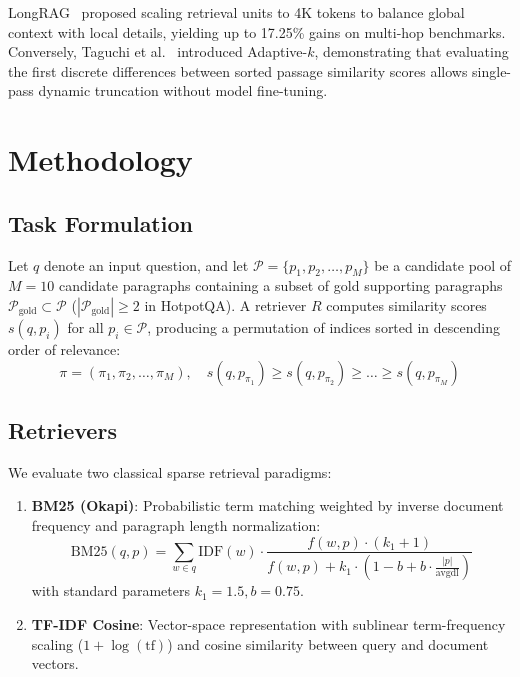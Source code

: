 \documentclass[conference]{IEEEtran}
\begin{document}
LongRAG~\cite{zhao2024longrag} proposed scaling retrieval units to 4K tokens to balance global context with local details, yielding up to 17.25\% gains on multi-hop benchmarks. Conversely, Taguchi et al.~\cite{taguchi2025adaptivek} introduced Adaptive-$k$, demonstrating that evaluating the first discrete differences between sorted passage similarity scores allows single-pass dynamic truncation without model fine-tuning.

\section{Methodology}
\subsection{Task Formulation}
Let $q$ denote an input question, and let $\mathcal{P} = \{p_1, p_2, \dots, p_M\}$ be a candidate pool of $M=10$ candidate paragraphs containing a subset of gold supporting paragraphs $\mathcal{P}_{\text{gold}} \subset \mathcal{P}$ ($|\mathcal{P}_{\text{gold}}| \ge 2$ in HotpotQA). A retriever $R$ computes similarity scores $s(q, p_i)$ for all $p_i \in \mathcal{P}$, producing a permutation of indices sorted in descending order of relevance:
\begin{equation}
    \pi = (\pi_1, \pi_2, \dots, \pi_M), \quad s(q, p_{\pi_1}) \ge s(q, p_{\pi_2}) \ge \dots \ge s(q, p_{\pi_M})
\end{equation}

\subsection{Retrievers}
We evaluate two classical sparse retrieval paradigms:
\begin{enumerate}
    \item \textbf{BM25 (Okapi)}: Probabilistic term matching weighted by inverse document frequency and paragraph length normalization:
    \begin{equation}
        \text{BM25}(q, p) = \sum_{w \in q} \text{IDF}(w) \cdot \frac{f(w, p) \cdot (k_1 + 1)}{f(w, p) + k_1 \cdot (1 - b + b \cdot \frac{|p|}{\text{avgdl}})}
    \end{equation}
    with standard parameters $k_1 = 1.5, b = 0.75$.
    \item \textbf{TF-IDF Cosine}: Vector-space representation with sublinear term-frequency scaling ($1 + \log(\text{tf})$) and cosine similarity between query and document vectors.
\end{enumerate}
\end{document}
